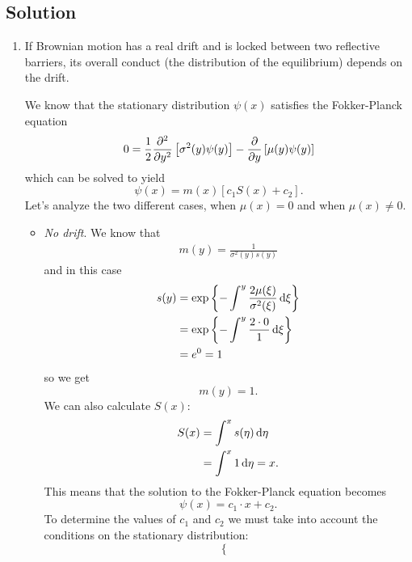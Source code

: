\documentclass[12pt]{article}
\begin{document}
	\subsection*{Solution}
	\begin{enumerate}
		\item If Brownian motion has a real drift and is locked between two reflective barriers, its overall conduct (the distribution of the equilibrium) depends on the drift. \par
		We know that the stationary distribution $\psi(x)$ satisfies the Fokker-Planck equation
		\begin{equation*}
			0=\frac{1}{2}\frac{\partial^{2}}{\partial y^{2}}\left[\sigma^{2}(y)\psi(y)\right]-\frac{\partial}{\partial y}\left[\mu(y)\psi(y)\right]
		\end{equation*} which can be solved to yield
		\begin{equation*}
			\psi(x)=m(x)\left[c_{1}S(x)+c_{2}\right].
		\end{equation*}
		Let's analyze the two different cases, when $\mu(x)=0$ and when $\mu(x)\neq0$.
		\begin{itemize}
			\item \emph{No drift}. We know that
				\begin{align*}
				m(y)=\frac{1}{\sigma^{2}(y)s(y)}
			\end{align*}
			and in this case
			\begin{align*}
				s(y)&=\exp\left\{-\int^{y}\frac{2\mu(\xi)}{\sigma^{2}(\xi)}\mathop{}\!\mathrm{d}\xi\right\}\\
				&=\exp\left\{-\int^{y}\frac{2\cdot 0}{1}\mathop{}\!\mathrm{d}\xi\right\}\\
				&=e^{0}=1
			\end{align*}
			so we get
			\begin{equation*}
				m(y)=1.
			\end{equation*}
			We can also calculate $S(x):$
			\begin{align*}
					S(x)&=\int^{x}s(\eta)\mathop{}\!\mathrm{d}\eta\\
					&=\int^{x}1\mathop{}\!\mathrm{d}\eta=x.
			\end{align*}
			This means that the solution to the Fokker-Planck equation becomes
			\begin{equation*}
				\psi(x)=c_{1}\cdot x+c_{2}.
			\end{equation*}
			To determine the values of $c_{1}$ and $c_{2}$ we must take into account the conditions on the stationary distribution:
			\begin{equation*}
				\begin{cases}

\end{cases}
\end{equation*}
\end{itemize}
\end{enumerate}
\end{document}
